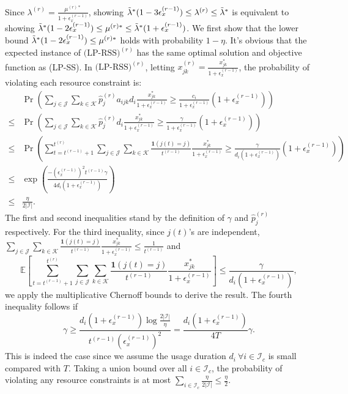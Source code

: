 \documentclass[letterpaper, 10 pt, conference]{ieeeconf}  %
\makeatletter
\renewenvironment{proof}[1][\relax]{\par
  \pushQED{\qed}%
  \normalfont \topsep6\p@\@plus6\p@\relax
  \trivlist
  \item[\hskip\labelsep\itshape
    \ifx#1\relax \proofname\else\proofname{} of #1\fi\@addpunct{.}]\ignorespaces
}{%
  \popQED\endtrivlist\@endpefalse
}
\newcommand{\III}{\mathcal{I}}
\newcommand{\JJJ}{\mathcal{J}}
\newcommand{\KKK}{\mathcal{K}}
\theoremstyle{plain}
\theoremstyle{definition}
\theoremstyle{remark}
\makeatother
\begin{document}
\begin{proof}[Lemma \ref{olem:3.3}]
Since $\lambda^{(r)} = \frac{\mu^{(r)*}}{1+\epsilon^{(r-1)}_{x}}$, showing $\Tilde{\lambda}^*(1-3\epsilon^{(r-1)}_{x}) \leq \lambda^{(r)} \leq \Tilde{\lambda}^*$ is equivalent to showing $\Tilde{\lambda}^*(1-2\epsilon^{(r-1)}_{x}) \leq \mu^{(r)*} \leq \Tilde{\lambda}^* (1+\epsilon^{(r-1)}_{x})$. We first show that the lower bound $\Tilde{\lambda}^* (1-2 \epsilon^{(r-1)}_{x}) \leq \mu^{(r)*}$ holds with probability $1-\eta$. It's obvious that the expected instance of $\text{(LP-RSS)}^{(r)}$ has the same optimal solution and objective function as (LP-SS). In $\text{(LP-RSS)}^{(r)}$, letting $x^{(r)}_{jk}=\frac{x^*_{jk}}{1+\epsilon^{(r-1)}_{x}}$, the probability of violating each resource constraint is:
\begin{subequations}
\begin{alignat}{2}
&\Pr\left(\sum_{j\in \JJJ}\sum_{k\in \KKK} \hat{p}^{(r)}_{j} a_{ijk} d_i \frac{x^*_{jk}}{1+\epsilon^{(r-1)}_{x}} \geq \frac{c_i}{1+\epsilon^{(r-1)}_{x}} \left(1+\epsilon^{(r-1)}_{x}\right)\right) \nonumber\\
\leq &\Pr\left(\sum_{j\in \JJJ}\sum_{k\in \KKK} \hat{p}^{(r)}_{j} d_i \frac{x^*_{jk}}{1+\epsilon^{(r-1)}_{x}} \geq \frac{\gamma}{1+\epsilon^{(r-1)}_{x}} \left(1+\epsilon^{(r-1)}_{x}\right)\right) \nonumber\\
\leq &\Pr\left(\sum^{t^{(r)}}_{t=t^{(r-1)}+1} \sum_{j\in \JJJ} \sum_{k\in \KKK} \frac{\mathbf{1}\left(j\left(t\right)=j\right)}{t^{(r-1)}} \frac{x^*_{jk}}{1+\epsilon^{(r-1)}_{x}} \geq \frac{\gamma}{d_i \left(1+\epsilon^{(r-1)}_{x}\right)} \left(1+\epsilon^{(r-1)}_{x}\right)\right) \nonumber \\
\leq & \exp\left(\frac{- \left(\epsilon^{(r-1)}_{x}\right)^2 t^{(r-1)} \gamma}{4 d_i \left(1+\epsilon^{(r-1)}_{x}\right)}\right) \nonumber \\
\leq & \frac{\eta}{2|\III|} \nonumber.
\end{alignat}
\end{subequations}
The first and second inequalities stand by the definition of $\gamma$ and $\hat{p}^{(r)}_{j}$ respectively. For the third inequality, since $j(t)$'s are independent, $\sum_{j\in \JJJ} \sum_{k\in \KKK} \frac{\mathbf{1}\left(j\left(t\right)=j\right)}{t^{(r-1)}} \frac{x^*_{jk}}{1+\epsilon^{(r-1)}_{x}} \leq \frac{1}{t^{(r-1)}}$ and $$\mathbb{E}\left[\sum^{t^{(r)}}_{t=t^{(r-1)}+1} \sum_{j\in \JJJ} \sum_{k\in \KKK} \frac{\mathbf{1}\left(j\left(t\right)=j\right)}{t^{(r-1)}} \frac{x^*_{jk}}{1+\epsilon^{(r-1)}_{x}}\right] \leq \frac{\gamma}{d_i \left(1+\epsilon^{(r-1)}_{x}\right)},$$ we apply the multiplicative Chernoff bounds to derive the result. The fourth inequality follows if $$\gamma \geq \frac{d_i (1+\epsilon^{(r-1)}_{x}) \log \frac{2|\III|}{\eta}}{t^{(r-1)} \left(\epsilon^{(r-1)}_{x}\right)^2} = \frac{d_i (1+\epsilon^{(r-1)}_{x})}{4T} \gamma.$$ This is indeed the case since we assume the usage duration $d_i ~\forall i \in \III_c$ is small compared with $T$. Taking a union bound over all $i \in \III_c$, the probability of violating any resource constraints is at most $\sum_{i \in \III_c} \frac{\eta}{2|\III|} \leq \frac{\eta}{2}$. 


\end{proof}
\end{document}
